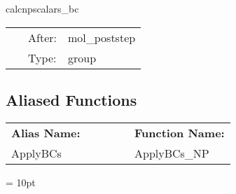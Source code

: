 \vspace{5mm}


\hspace{5mm} calcnpscalars\_bc 

\hspace{5mm}{\it boundary conditions } 


\hspace{5mm}

 \begin{tabular*}{160mm}{cll} 
~ & After:  & mol\_poststep \\ 
~ & Type:  & group \\ 
\end{tabular*} 


\subsection*{Aliased Functions}

\hspace{5mm}

 \begin{tabular*}{160mm}{ll} 

{\bf Alias Name:} ~~~~~~~ & {\bf Function Name:} \\ 
ApplyBCs & ApplyBCs\_NP \\ 
\end{tabular*} 



\vspace{5mm}\parskip = 10pt 
